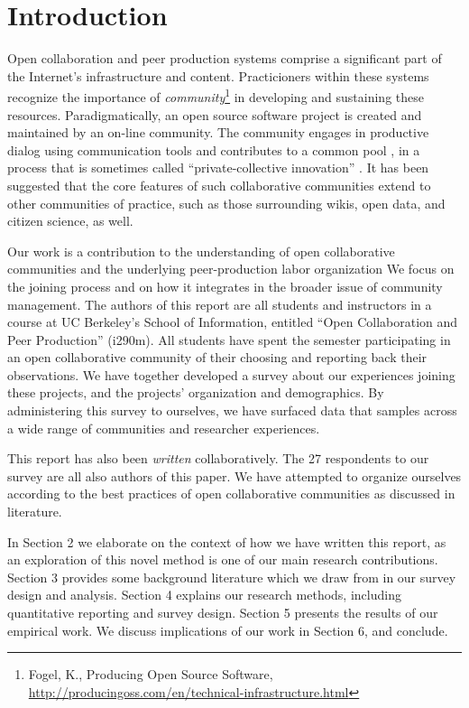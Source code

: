 \section{Introduction}

Open collaboration and peer production systems comprise a significant
part of the Internet's infrastructure and content.
Practicioners within these systems recognize the importance of
\emph{community}\footnote{Fogel, K., Producing Open Source Software, \url{http://producingoss.com/en/technical-infrastructure.html}} in developing and sustaining these resources.
Paradigmatically, an open source software project is created and maintained by an on-line community.
The community engages in productive dialog using communication tools and contributes to
a common pool \cite{ostrom1990}, in a process that is sometimes called ``private-collective innovation'' \cite{vonhippel2003oss}.
It has been suggested that the core features of such collaborative
communities extend to other communities of practice, such as those
surrounding wikis, open data, and citizen science, as well.

Our work is a contribution to the understanding of  open collaborative
communities and the underlying peer-production labor organization \cite{benkler2002}
We focus on the joining process and on how
it integrates in the broader issue of community management.
The authors of this report are all students and instructors in a
course at UC Berkeley's School of Information, entitled ``Open Collaboration and Peer Production'' (i290m).
All students have spent the semester participating in an open
collaborative community of their choosing and reporting back
their observations.
We have together developed a survey about our experiences joining
these projects, and the projects' organization and demographics.
By administering this survey to ourselves, we have surfaced data
that samples across a wide range of communities and researcher experiences.



This report has also been \emph{written} collaboratively.
The 27 respondents  to our survey are all also authors of this paper.
We have attempted to organize ourselves according
to the best practices of open collaborative communities as discussed in literature.


In Section 2 we elaborate on the context of how we have written this report, as an exploration of this novel method is one of our main research contributions.
Section 3 provides some background literature which we draw from in
our survey design and analysis.
Section 4 explains our research methods, including quantitative
reporting and survey design.
Section 5 presents the results of our empirical work.
We discuss implications of our work in Section 6, and conclude. 


